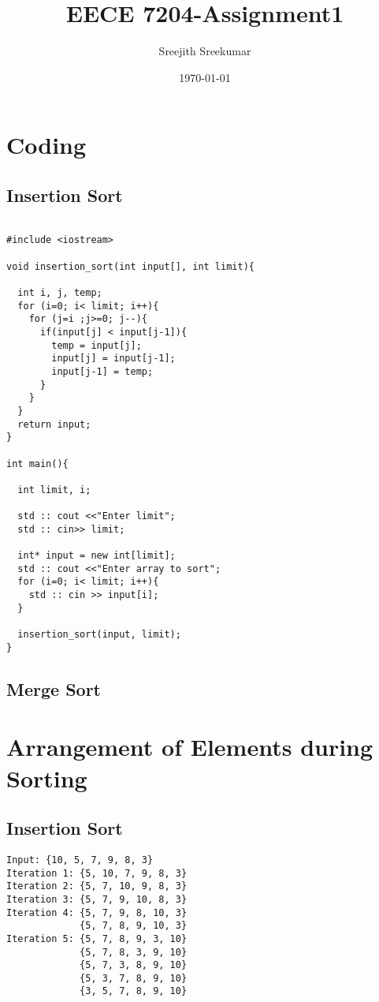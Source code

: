 \documentclass{article}
\title{EECE 7204-Assignment1}
\author{Sreejith Sreekumar}
\date{\today}
\begin{document}
\maketitle
\section{Coding}
\subsection{Insertion Sort}

\begin{verbatim}

#include <iostream>

void insertion_sort(int input[], int limit){

  int i, j, temp;
  for (i=0; i< limit; i++){
    for (j=i ;j>=0; j--){
      if(input[j] < input[j-1]){
    	temp = input[j];
	    input[j] = input[j-1];
	    input[j-1] = temp;
      }
    }
  }
  return input;
}

int main(){

  int limit, i;

  std :: cout <<"Enter limit";
  std :: cin>> limit;

  int* input = new int[limit];
  std :: cout <<"Enter array to sort";
  for (i=0; i< limit; i++){
    std :: cin >> input[i];
  }

  insertion_sort(input, limit);
}
\end{verbatim}

\subsection{Merge Sort}

\section{Arrangement of Elements during Sorting}
\subsection{Insertion Sort}
\begin{verbatim}
Input: {10, 5, 7, 9, 8, 3}
Iteration 1: {5, 10, 7, 9, 8, 3}
Iteration 2: {5, 7, 10, 9, 8, 3}
Iteration 3: {5, 7, 9, 10, 8, 3}
Iteration 4: {5, 7, 9, 8, 10, 3}
             {5, 7, 8, 9, 10, 3}
Iteration 5: {5, 7, 8, 9, 3, 10}
             {5, 7, 8, 3, 9, 10}
             {5, 7, 3, 8, 9, 10}
             {5, 3, 7, 8, 9, 10}
             {3, 5, 7, 8, 9, 10}
\end{verbatim}
\end{document}
